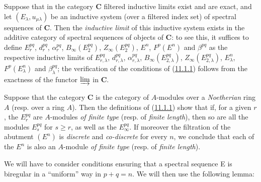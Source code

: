 \begin{env}[11.1.7]
\label{0.11.1.7}
Suppose that in the category $\boldsymbol{C}$ filtered inductive limits
exist and are exact, and let $(E_\lambda,u_{\mu\lambda})$ be an
inductive system (over a filtered index set) of spectral sequences of
$\boldsymbol{C}$. Then the \emph{inductive limit} of this inductive system exists
in the additive category of spectral sequences of objects of $\boldsymbol{C}$:
to see this, it suffices to define $E_r^{pq}$, $d_r^{pq}$, $\alpha_r^{pq}$,
$B_\infty(E_2^{pq})$, $Z_\infty(E_2^{pq})$, $E^n$, $F^p(E^n)$ and
$\beta^{pq}$ as the respective inductive limits of $E_{r,\lambda}^{pq}$,
$d_{r,\lambda}^{pq}$, $\alpha_{r,\lambda}^{pq}$,
$B_\infty(E_{2,\lambda}^{pq})$, $Z_\infty(E_{2,\lambda}^{pq})$,
$E_\lambda^n$, $F^p(E_\lambda^n)$ and $\beta_\lambda^{pq}$; the verification
of the conditions of (\hyperref[0.11.1.1]{11.1.1}) follows from the exactness of the
functor $\varinjlim$ in $\boldsymbol{C}$.
\end{env}

\begin{remark}[11.1.8]
\label{0.11.1.8}
Suppose that the category $\boldsymbol{C}$ is the category of $A$-modules over
a \emph{Noetherian} ring $A$ (resp. over a ring $A$). Then the
definitions of (\hyperref[0.11.1.1]{11.1.1}) show that if, for a given $r$,
the $E_r^{pq}$ are $A$-modules \emph{of finite type} (resp. of
\emph{finite length}), then so are all the modules $E_s^{pq}$ for
$s\geq r$, as well as the $E_\infty^{pq}$. If moreover the filtration of
the abutment $(E^n)$ is \emph{discrete} and \emph{co-discrete} for every $n$, we
conclude that each of the $E^n$ is also an $A$-module \emph{of finite type}
(resp. of \emph{finite length}).
\end{remark}

\begin{env}[11.1.9]
\label{0.11.1.9}
We will have to consider conditions ensuring that a spectral sequence E is
biregular in a ``uniform'' way in $p+q=n$. We will then use the following
lemma:
\end{env}

